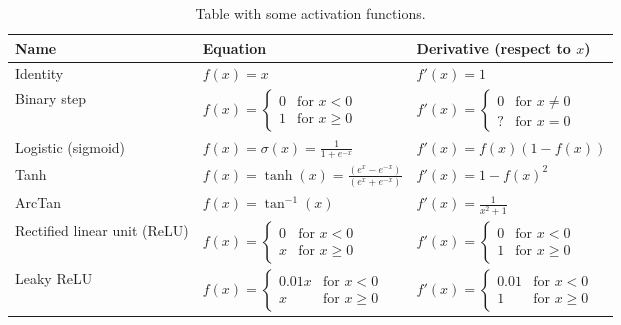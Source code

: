 \begin{table}[!h]
  \centering
  \renewcommand{\arraystretch}{2.4}
  \begin{tabular}{@{}lll@{}} \toprule
    \textbf{Name} \hspace{3.2cm}    & \textbf{Equation} \hspace{3cm} & \textbf{Derivative (respect to $x$)} \\ \midrule
    Identity                      & $f(x)=x$          & $f'(x)=1$           \\
    Binary step                   & $\displaystyle f(x)={\begin{cases}0&{\text{for }}x<0\\1&{\text{for }}x\geq 0\end{cases}}$ & $\displaystyle f'(x)={\begin{cases}0&{\text{for }}x\neq 0\\?&{\text{for }}x=0\end{cases}}$ \\
    Logistic (sigmoid)            & $\displaystyle f(x)=\sigma (x)={\frac {1}{1+e^{-x}}}$ & $\displaystyle f'(x)=f(x)(1-f(x))$ \\
    Tanh                          & $\displaystyle f(x)=\tanh(x)={\frac {(e^{x}-e^{-x})}{(e^{x}+e^{-x})}}$ & $\displaystyle f'(x)=1-f(x)^{2}$ \\
    ArcTan                        & $\displaystyle f(x)=\tan ^{-1}(x)$ & $\displaystyle f'(x)={\frac {1}{x^{2}+1}}$ \\
    Rectified linear unit (ReLU)  & $\displaystyle f(x)={\begin{cases}0&{\text{for }}x<0\\x&{\text{for }}x\geq 0\end{cases}}$ & $\displaystyle f'(x)={\begin{cases}0&{\text{for }}x<0\\1&{\text{for }}x\geq 0\end{cases}}$ \\
    Leaky ReLU                    & $\displaystyle f(x)={\begin{cases}0.01x&{\text{for }}x<0\\x&{\text{for }}x\geq 0\end{cases}}$ & $\displaystyle f'(x)={\begin{cases}0.01&{\text{for }}x<0\\1&{\text{for }}x\geq 0\end{cases}}$ \\ \bottomrule
  \end{tabular}
  \caption{Table with some activation functions.}
  \label{table:actfuncs}
\end{table}


